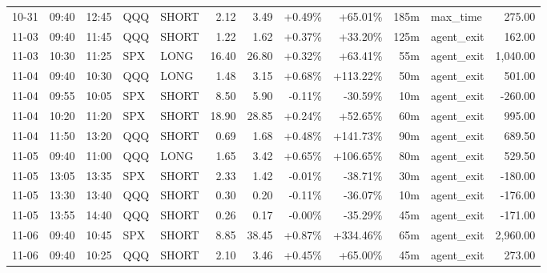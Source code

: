 \documentclass[11pt,a4paper,twoside]{article}
\begin{document}
\begin{center}
\begin{longtable}{>{\color{txtmain}}l l l l l r r r r r >{\color{txtmain}}l r}
10-31 & 09:40 & 12:45 & QQQ & SHORT & 2.12 & 3.49 & \textcolor{wingreen}{+0.49\%} & \textcolor{wingreen}{+65.01\%} & 185m & max\_time & \textcolor{wingreen}{275.00} \\
11-03 & 09:40 & 11:45 & QQQ & SHORT & 1.22 & 1.62 & \textcolor{wingreen}{+0.37\%} & \textcolor{wingreen}{+33.20\%} & 125m & agent\_exit & \textcolor{wingreen}{162.00} \\
11-03 & 10:30 & 11:25 & SPX & LONG & 16.40 & 26.80 & \textcolor{wingreen}{+0.32\%} & \textcolor{wingreen}{+63.41\%} & 55m & agent\_exit & \textcolor{wingreen}{1,040.00} \\
11-04 & 09:40 & 10:30 & QQQ & LONG & 1.48 & 3.15 & \textcolor{wingreen}{+0.68\%} & \textcolor{wingreen}{+113.22\%} & 50m & agent\_exit & \textcolor{wingreen}{501.00} \\
11-04 & 09:55 & 10:05 & SPX & SHORT & 8.50 & 5.90 & \textcolor{lossred}{-0.11\%} & \textcolor{lossred}{-30.59\%} & 10m & agent\_exit & \textcolor{lossred}{-260.00} \\
11-04 & 10:20 & 11:20 & SPX & SHORT & 18.90 & 28.85 & \textcolor{wingreen}{+0.24\%} & \textcolor{wingreen}{+52.65\%} & 60m & agent\_exit & \textcolor{wingreen}{995.00} \\
11-04 & 11:50 & 13:20 & QQQ & SHORT & 0.69 & 1.68 & \textcolor{wingreen}{+0.48\%} & \textcolor{wingreen}{+141.73\%} & 90m & agent\_exit & \textcolor{wingreen}{689.50} \\
11-05 & 09:40 & 11:00 & QQQ & LONG & 1.65 & 3.42 & \textcolor{wingreen}{+0.65\%} & \textcolor{wingreen}{+106.65\%} & 80m & agent\_exit & \textcolor{wingreen}{529.50} \\
11-05 & 13:05 & 13:35 & SPX & SHORT & 2.33 & 1.42 & \textcolor{lossred}{-0.01\%} & \textcolor{lossred}{-38.71\%} & 30m & agent\_exit & \textcolor{lossred}{-180.00} \\
11-05 & 13:30 & 13:40 & QQQ & SHORT & 0.30 & 0.20 & \textcolor{lossred}{-0.11\%} & \textcolor{lossred}{-36.07\%} & 10m & agent\_exit & \textcolor{lossred}{-176.00} \\
11-05 & 13:55 & 14:40 & QQQ & SHORT & 0.26 & 0.17 & \textcolor{lossred}{-0.00\%} & \textcolor{lossred}{-35.29\%} & 45m & agent\_exit & \textcolor{lossred}{-171.00} \\
11-06 & 09:40 & 10:45 & SPX & SHORT & 8.85 & 38.45 & \textcolor{wingreen}{+0.87\%} & \textcolor{wingreen}{+334.46\%} & 65m & agent\_exit & \textcolor{wingreen}{2,960.00} \\
11-06 & 09:40 & 10:25 & QQQ & SHORT & 2.10 & 3.46 & \textcolor{wingreen}{+0.45\%} & \textcolor{wingreen}{+65.00\%} & 45m & agent\_exit & \textcolor{wingreen}{273.00} \\

\end{longtable}
\end{center}
\end{document}
